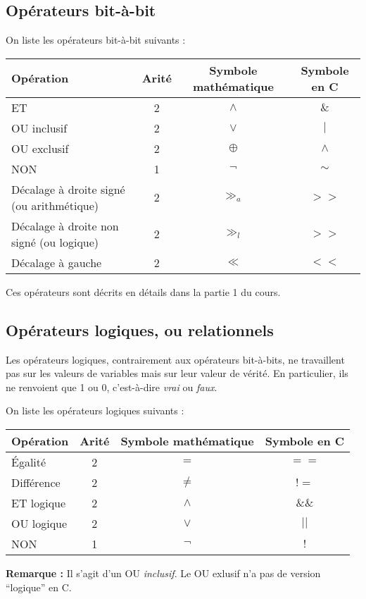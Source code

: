 \documentclass[../../../main.tex]{subfiles}
\begin{document}
\subsection{Opérateurs bit-à-bit}
On liste les opérateurs bit-à-bit suivants :
\begin{center}
\begin{tabular}{l|c|c|c}
Opération & Arité & Symbole mathématique & Symbole en C \\
\hline
ET & 2 & $\wedge$ & $\&$ \\
OU inclusif & 2 & $\vee$ & $|$ \\
OU exclusif & 2 & $\oplus$ & $\wedge$ \\
NON & 1 & $\neg$ & $\sim$ \\
Décalage à droite signé (ou arithmétique) & 2 & $\gg_{a}$ & $>>$ \\
Décalage à droite non signé (ou logique) & 2 & $\gg_{l}$ & $>>$ \\
Décalage à gauche & 2 & $\ll$ & $<<$
\end{tabular}
\end{center}
Ces opérateurs sont décrits en détails dans la partie 1 du cours.
\subsection{Opérateurs logiques, ou relationnels}
 
Les opérateurs logiques, contrairement aux opérateurs bit-à-bits, ne travaillent pas sur les valeurs de variables mais sur leur valeur de vérité. En particulier, ils ne renvoient que 1 ou 0, c'est-à-dire \textit{vrai} ou \textit{faux}.
 
On liste les opérateurs logiques suivants :
\begin{center}
\begin{tabular}{l|c|c|c}
Opération & Arité & Symbole mathématique & Symbole en C \\
\hline
Égalité & 2 & $=$ & $==$ \\
Différence & 2 & $\neq$ & $!=$ \\
ET logique & 2 & $\wedge$ & $\&\&$ \\
OU logique & 2 & $\vee$ & $||$ \\
NON & 1 & $\neg$ & $!$
\end{tabular}
\end{center}
\textbf{Remarque :} Il s'agit d'un OU \textit{inclusif}. Le OU exlusif n'a pas de version ``logique'' en C.
 
\end{document}
